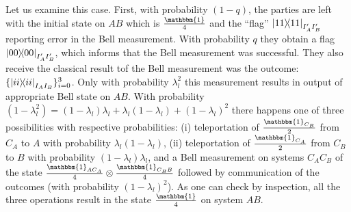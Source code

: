 \documentclass[aps,pra,twocolumn,superscriptaddress,longbibliography]{revtex4-1}
\newcommand{\bbm}[1]{\mathbbm{#1}}
\begin{document}
\begin{appendix}
Let us examine this case. First, with probability $(1-q)$, the parties are left with the initial state on $AB$ which is $\bbm{1} \over 4$ and the ``flag'' $\op{11}_{I'_AI'_B}$ reporting error in the Bell measurement. With probability $q$ they obtain a flag $\op{00}_{I'_AI'_B}$, which informs that the Bell measurement was successful. They also receive the classical result
tof the Bell measurement was the outcome: $\{\op{ii}_{I_AI_B}\}_{i=0}^3$. Only with probability $\lambda_l^2$ this measurement results in output of appropriate Bell state on $AB$.
With probability $(1-\lambda_l^2)=(1-\lambda_l)\lambda_l+ \lambda_l(1-\lambda_l)+(1-\lambda_l)^2$ there happens one of three possibilities with respective probabilities: (i) teleportation of ${\bbm{1}_{C_B}\over 2}$ from $C_A$ to $A$ with probability $\lambda_l(1-\lambda_l)$, (ii) teleportation of ${\bbm{1}_{C_A}\over 2}$ from $C_B$ to $B$ with probability $(1-\lambda_l)\lambda_l$, and a Bell measurement on systems $C_AC_B$ of the state ${\bbm{1}_{AC_A}\over 4}\otimes {\bbm{1}_{C_BB}\over 4}$ followed by communication of the outcomes (with probability $(1-\lambda_l)^2$). As one can check by inspection, all the three operations result in the state ${\bbm{1}\over 4}$ on system $AB$.


\end{appendix}
\end{document}
